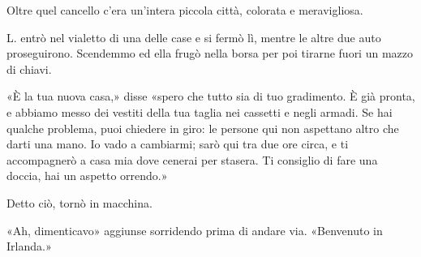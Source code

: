 \documentclass[a4paper,12pt]{book}
\begin{document}
Oltre quel cancello c’era un’intera piccola città, colorata e meravigliosa.

L. entrò nel vialetto di una delle case e si fermò lì, mentre le altre due
auto proseguirono. Scendemmo ed ella frugò nella borsa per poi tirarne fuori un
mazzo di chiavi.

«È la tua nuova casa,» disse «spero che tutto sia di tuo gradimento. È già
pronta, e abbiamo messo dei vestiti della tua taglia nei cassetti e negli
armadi. Se hai qualche problema, puoi chiedere in giro: le persone qui non
aspettano altro che darti una mano. Io vado a cambiarmi; sarò qui tra due ore
circa, e ti accompagnerò a casa mia dove cenerai per stasera. Ti consiglio di
fare una doccia, hai un aspetto orrendo.»

Detto ciò, tornò in macchina.

«Ah, dimenticavo» aggiunse sorridendo prima di andare via. «Benvenuto in
Irlanda.»

\end{document}
